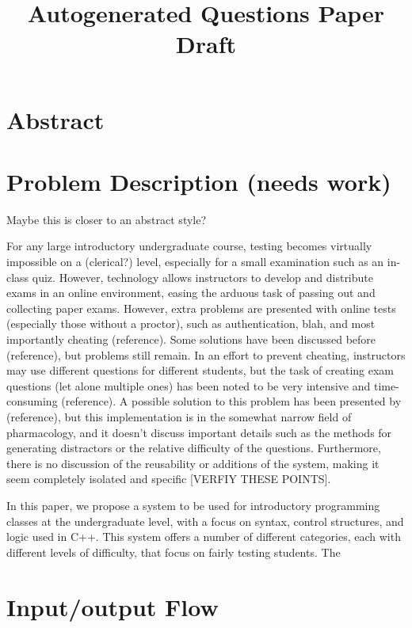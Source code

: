 \documentclass{article}
\title{Autogenerated Questions Paper Draft}
\date{ }
\begin{document}
\maketitle

\tableofcontents

\section{Abstract}

\section{Problem Description (needs work)}

Maybe this is closer to an abstract style?

For any large introductory undergraduate course, testing becomes virtually impossible on a (clerical?) level, especially for a small examination
such as an in-class quiz. However, technology allows instructors to develop and distribute exams in an online environment,
easing the arduous task of passing out and collecting paper exams. However, extra problems are presented with online tests (especially those
without a proctor), such as authentication, blah, and most importantly cheating (reference). Some solutions have been discussed before (reference),
but problems still remain. In an effort to prevent cheating, instructors may use different questions for different students, but the task of creating exam
questions (let alone multiple ones) has been noted to be very intensive and time-consuming (reference). A possible solution to this problem has been
presented by (reference), but this implementation is in the somewhat narrow field of pharmacology, and it doesn't discuss important details such as
the methods for generating distractors or the relative difficulty of the questions. Furthermore, there is no discussion of the reusability or additions of the system, making it seem completely isolated
and specific [VERFIY THESE POINTS].

In this paper, we propose a system to be used for introductory programming classes at the undergraduate level, with a focus on syntax, control structures, and logic used in C++. This system offers a number of different categories, each with different levels of difficulty, that focus on fairly testing students. The


\section{Input/output Flow}
\end{document}
